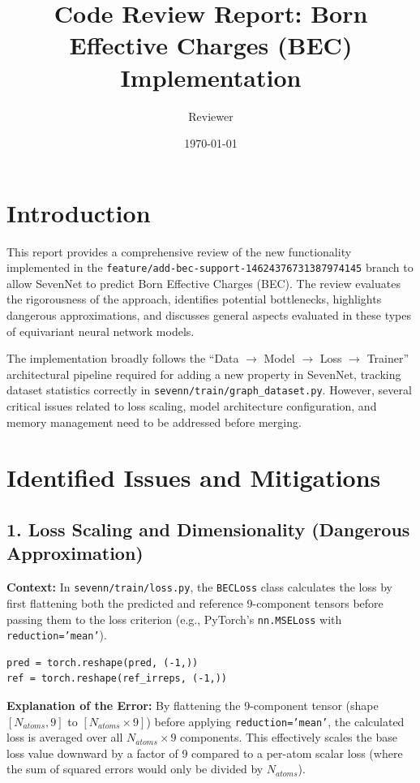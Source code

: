 \documentclass[12pt]{article}
\title{Code Review Report: Born Effective Charges (BEC) Implementation}
\author{Reviewer}
\date{\today}
\begin{document}
\maketitle

\section{Introduction}
This report provides a comprehensive review of the new functionality implemented in the \texttt{feature/add-bec-support-14624376731387974145} branch to allow SevenNet to predict Born Effective Charges (BEC). The review evaluates the rigorousness of the approach, identifies potential bottlenecks, highlights dangerous approximations, and discusses general aspects evaluated in these types of equivariant neural network models.

The implementation broadly follows the ``Data $\to$ Model $\to$ Loss $\to$ Trainer'' architectural pipeline required for adding a new property in SevenNet, tracking dataset statistics correctly in \texttt{sevenn/train/graph\_dataset.py}. However, several critical issues related to loss scaling, model architecture configuration, and memory management need to be addressed before merging.

\section{Identified Issues and Mitigations}

\subsection{1. Loss Scaling and Dimensionality (Dangerous Approximation)}
\textbf{Context:} In \texttt{sevenn/train/loss.py}, the \texttt{BECLoss} class calculates the loss by first flattening both the predicted and reference 9-component tensors before passing them to the loss criterion (e.g., PyTorch's \texttt{nn.MSELoss} with \texttt{reduction='mean'}).
\begin{verbatim}
pred = torch.reshape(pred, (-1,))
ref = torch.reshape(ref_irreps, (-1,))
\end{verbatim}

\textbf{Explanation of the Error:} By flattening the 9-component tensor (shape $[N_{atoms}, 9]$ to $[N_{atoms} \times 9]$) before applying \texttt{reduction='mean'}, the calculated loss is averaged over all $N_{atoms} \times 9$ components. This effectively scales the base loss value downward by a factor of 9 compared to a per-atom scalar loss (where the sum of squared errors would only be divided by $N_{atoms}$).
\end{document}
